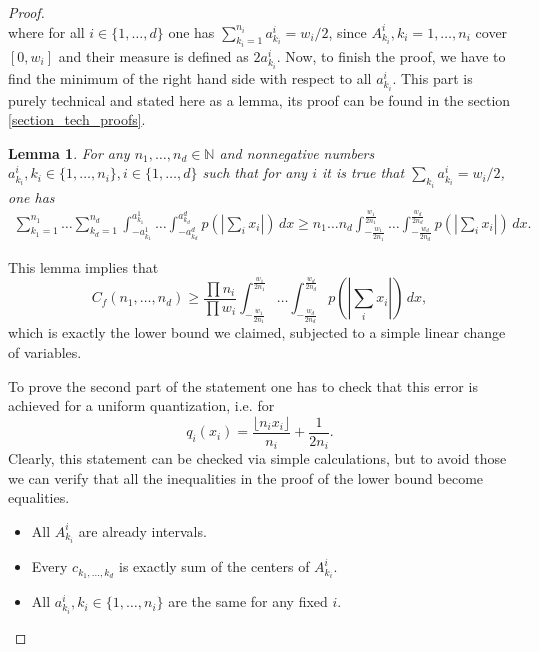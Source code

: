 \documentclass{amsart}
\newtheorem{lemma}[theorem]{Lemma}
\theoremstyle{remark}
\numberwithin{equation}{section}
\numberwithin{figure}{section}
\begin{document}
\begin{proof}
\[	\]
	where for all $i\in \{1, \ldots, d\}$ one has $\sum_{k_i = 1}^{n_i} a_{k_i}^i = w_i/2$, since $A_{k_i}^i, k_i = 1, \ldots, n_i$ cover $[0, w_i]$ and their measure is defined as $2a_{k_i}^i$.
	Now, to finish the proof, we have to find the minimum of the right hand side with respect to all $a_{k_i}^i$. This part is purely technical and stated here as a lemma, its proof can be found in the section \ref{section_tech_proofs}.
	\begin{lemma}
		\label{lemma_lagrange}
		For any $n_1, \ldots, n_d \in \mathbb{N}$ and nonnegative numbers $a_{k_i}^i, k_i \in \{1, \ldots, n_i\}, i \in \{1, \ldots, d\}$ such that for any $i$ it is true that 
		$\sum_{k_i} a_{k_i}^i = w_i/2$, one has
\begin{equation}\label{eq_est_n12int1}
\begin{aligned}
		\sum_{k_1=1}^{n_1}\ldots \sum_{k_d=1}^{n_d} \int_{-a_{k_1}^1}^{a_{k_1}^1} \ldots \int_{-a_{k_d}^d}^{a_{k_d}^d} p(|\sum_i x_i|) \, dx
		\geq
		n_1 \ldots n_d \int_{-\frac{w_1}{2n_1}}^{\frac{w_1}{2n_1}} \ldots \int_{-\frac{w_d}{2n_d}}^{\frac{w_d}{2n_d}} p(|\sum_i x_i|) \, dx.
\end{aligned}	
\end{equation}	
\end{lemma}
	
This lemma implies that
	\[
	C_f(n_1, \ldots, n_d) \geq  \frac{\prod n_i}{\prod w_i}  \int_{-\frac{w_1}{2n_1}}^{\frac{w_1}{2n_1}} \ldots \int_{-\frac{w_d}{2n_d}}^{\frac{w_d}{2n_d}} p(|\sum_i x_i|) \, dx,
	\]
which is exactly the lower bound we claimed, subjected to a simple linear change of variables. 

	To prove the second part of the statement one has to check that this error is achieved for a uniform quantization, i.e. for 
	\[
	q_i(x_i) = \frac{\lfloor n_ix_i \rfloor}{n_i} + \frac{1}{2n_i}.
	 \]
	 Clearly, this statement can be checked via simple calculations, but to avoid those we can verify that all the inequalities in the proof of the lower bound become equalities. 
	\begin{itemize}
		\item All $A_{k_i}^i$ are already intervals.
		\item Every $c_{k_1, \ldots, k_d}$ is exactly sum of the centers of $A_{k_i}^i$.
		\item All $a_{k_i}^i, k_i \in \{1, \ldots, n_i\}$ are the same for any fixed $i$.
	\end{itemize}	
\end{proof}
\end{document}
